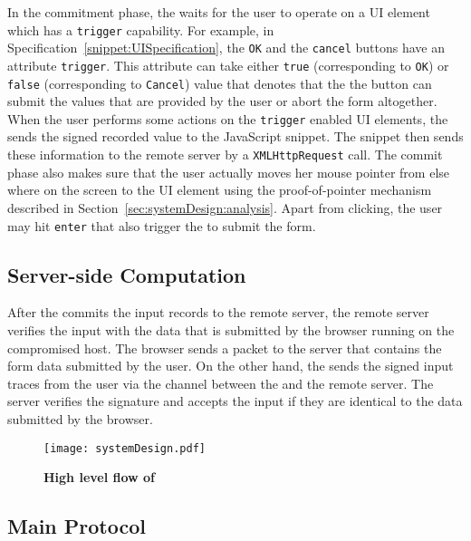  In the commitment phase, the \device waits for the user to operate on a UI element which has a \texttt{trigger} capability. For example, in Specification~\ref{snippet:UISpecification}, the \texttt{OK} and the \texttt{cancel} buttons have an attribute \texttt{trigger}. This attribute can take either \texttt{true} (corresponding to \texttt{OK}) or \texttt{false} (corresponding to \texttt{Cancel}) value that denotes that the the button can submit the values that are provided by the user or abort the form altogether. When the user performs some actions on the \texttt{trigger} enabled UI elements, the \device sends the signed recorded value to the \name JavaScript snippet. The \name \js snippet then sends these information to the remote server by a \texttt{XMLHttpRequest} call. The commit phase also makes sure that the user actually moves her mouse pointer from else where on the screen to the UI element using the proof-of-pointer mechanism described in Section~\ref{sec:systemDesign:analysis}. Apart from clicking, the user may hit \texttt{enter} that also trigger the \device to submit the form. 


\subsection{Server-side Computation}
\label{sec:systemDesign:serverSide}

After the \device commits the input records to the remote server, the remote server verifies the input with the data that is submitted by the browser running on the compromised host. The browser sends a \http packet to the server that contains the form data submitted by the user. On the other hand, the \device sends the signed input traces from the user via the \tls channel between the \device and the remote server. The server verifies the signature and accepts the input if they are identical to the data submitted by the browser.

\begin{figure}[t]
\centering
\texttt{[image: systemDesign.pdf]}
\caption{\textbf{High level flow of \name}}
\label{fig:systemDesign}
\centering
\end{figure}

\subsection{Main Protocol}
\label{sec:systemDesign:mainProtocol}

